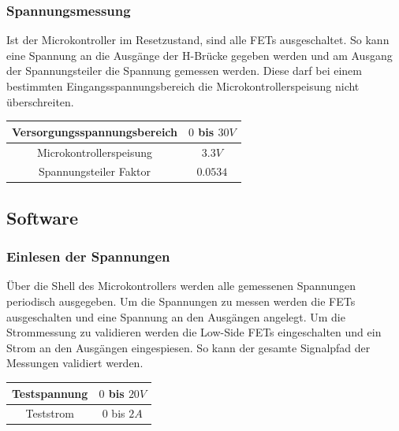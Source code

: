 
\subsubsection*{Spannungsmessung}
Ist der Microkontroller im Resetzustand, sind alle FETs ausgeschaltet. So kann eine Spannung an die Ausgänge der H-Brücke gegeben werden und am Ausgang der Spannungsteiler die Spannung gemessen werden. Diese darf bei einem bestimmten Eingangsspannungsbereich die Microkontrollerspeisung nicht überschreiten.

\begin{center}
	\begin{tabular}{|c|c|}
		\hline 
		Versorgungsspannungsbereich & $0$ bis $30V$ \\ \hline
		Microkontrollerspeisung & $3.3V$ \\ \hline
		Spannungsteiler Faktor & $0.0534$ \\ \hline
	\end{tabular} 
	\label{tab:vmessbed}
\end{center}


\subsection*{Software}
\subsubsection*{Einlesen der Spannungen}
Über die Shell des Microkontrollers werden alle gemessenen Spannungen periodisch ausgegeben. Um die Spannungen zu messen werden die FETs ausgeschalten und eine Spannung an den Ausgängen angelegt. Um die Strommessung zu validieren werden die Low-Side FETs eingeschalten und ein Strom an den Ausgängen eingespiesen. So kann der gesamte Signalpfad der Messungen validiert werden.

\begin{center}
	\begin{tabular}{|c|c|}
		\hline 
		Testspannung & $0$ bis $20V$ \\ \hline
		Teststrom & $0$ bis $2A$ \\ \hline
	\end{tabular} 
	\label{tab:swvmessbed}
\end{center}

